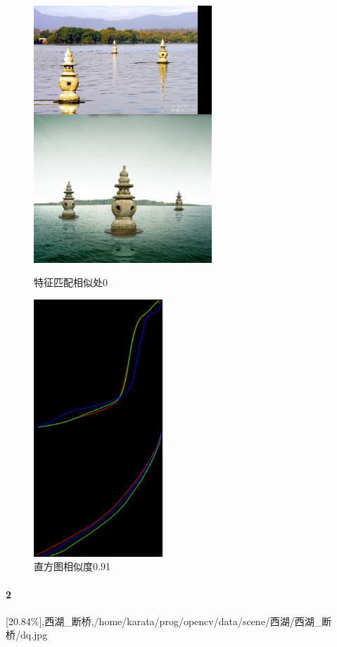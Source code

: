 \begin{figure}[htb]
\begin{minipage}[t]{0.5\linewidth}
\centering
\includegraphics[height=3.8in]{三映.jpg.d/im1sift.jpg}
\caption{特征匹配相似处0}
\label{fig:side:a}
\end{minipage}%
\begin{minipage}[t]{0.5\linewidth}
\centering
\includegraphics[height=3.8in]{三映.jpg.d/im1hist2.jpg}
\caption{直方图相似度0.91}
\label{fig:side:a}
\end{minipage}%
\end{figure}

\clearpage
\paragraph{2}
[20.84\%],西湖\_断桥,/home/karata/prog/opencv/data/scene/西湖/西湖\_断桥/dq.jpg

